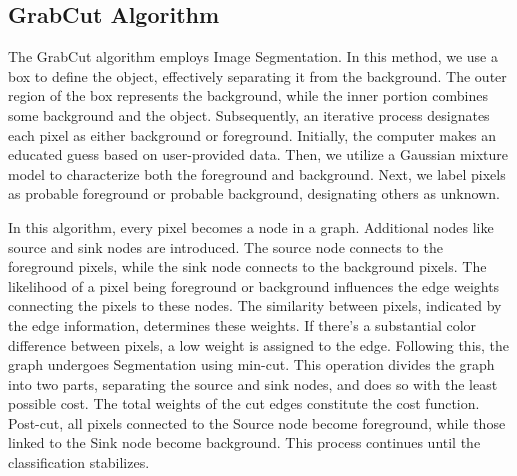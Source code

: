 \documentclass[12pt, a4paper, twoside]{article}
\begin{document}
\subsection{GrabCut Algorithm}
The GrabCut algorithm\cite{grabcut} employs Image Segmentation. In this method, we use a box to define the object, effectively separating it from the background. The outer region of the box represents the background, while the inner portion combines some background and the object. Subsequently, an iterative process designates each pixel as either background or foreground. Initially, the computer makes an educated guess based on user-provided data. Then, we utilize a Gaussian mixture model to characterize both the foreground and background. Next, we label pixels as probable foreground or probable background, designating others as unknown.
\par
In this algorithm, every pixel becomes a node in a graph. Additional nodes like source and sink nodes are introduced. The source node connects to the foreground pixels, while the sink node connects to the background pixels. The likelihood of a pixel being foreground or background influences the edge weights connecting the pixels to these nodes. The similarity between pixels, indicated by the edge information, determines these weights. If there's a substantial color difference between pixels, a low weight is assigned to the edge. Following this, the graph undergoes Segmentation using min-cut. This operation divides the graph into two parts, separating the source and sink nodes, and does so with the least possible cost. The total weights of the cut edges constitute the cost function. Post-cut, all pixels connected to the Source node become foreground, while those linked to the Sink node become background. This process continues until the classification stabilizes.
\end{document}
